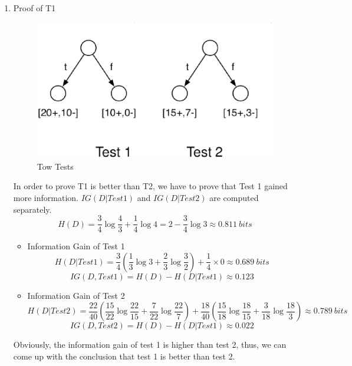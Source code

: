\documentclass[a4paper, 12pt, titlepage]{article}
\begin{document}
\begin{enumerate}
\item Proof of T1
            \begin{figure}[H]
                \centering
                \includegraphics[width=12cm]{tests.eps}
                \caption{Tow Tests}\label{tests}
            \end{figure}

In order to prove T1 is better than T2, we have to prove that Test 1 gained more information. $IG(D|Test1)$ and $IG(D|Test2)$ are computed separately.
        $$H(D) = \frac{3}{4}\log{\frac{4}{3}}+\frac{1}{4}\log{4}=2-\frac{3}{4}\log{3}\approx0.811~bits$$
\begin{itemize}
        \item Information Gain of Test 1
            $$H(D|Test1) = \frac{3}{4}(\frac{1}{3}\log{3} + \frac{2}{3}\log{\frac{3}{2}})+\frac{1}{4}\times0 \approx 0.689~bits$$
            $$IG(D,Test1) = H(D) - H(D|Test1) \approx 0.123$$
        \item Information Gain of Test 2
            $$H(D|Test2) = \frac{22}{40}(\frac{15}{22}\log{\frac{22}{15}} + \frac{7}{22}\log{\frac{22}{7}}) + \frac{18}{40}(\frac{15}{18}\log{\frac{18}{15}} + \frac{3}{18}\log{\frac{18}{3}})\approx 0.789~bits$$
            $$IG(D,Test2) = H(D) - H(D|Test1) \approx 0.022$$
\end{itemize}
Obviously, the information gain of test 1 is higher than test 2, thus, we can come up with the conclusion that test 1 is better than test 2.
\end{enumerate}
\end{document}
